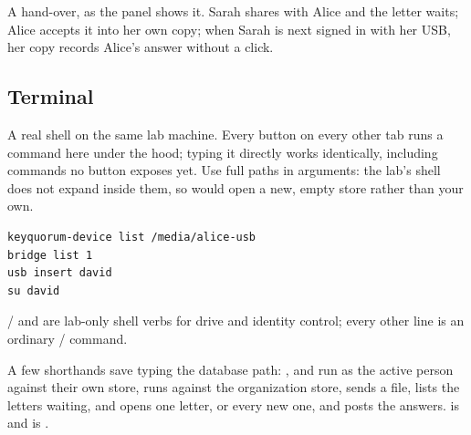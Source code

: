 A hand-over, as the panel shows it. Sarah shares  with
Alice and the letter waits; Alice accepts it into her own copy; when Sarah is
next signed in with her USB, her copy records Alice's answer without a click.





\subsection{Terminal}
\label{sec:lab-terminal}

A real shell on the same lab machine. Every button on every other tab runs
a command here under the hood; typing it directly works identically,
including commands no button exposes yet.
Use full paths in  arguments: the lab's shell does not
expand \code{~} inside them, so  would open a
new, empty store rather than your own.

\begin{lstlisting}
keyquorum-device list /media/alice-usb
bridge list 1
usb insert david
su david
\end{lstlisting}

 /  and  are lab-only shell verbs
for drive and identity control; every other line is an ordinary
 /  command.

A few shorthands save typing the database path: ,  and
 run as the active person against their own store, 
runs against the organization store,  sends a file,
 lists the letters waiting, and  opens one
letter, or every new one, and posts the answers.  is
 and  is .

